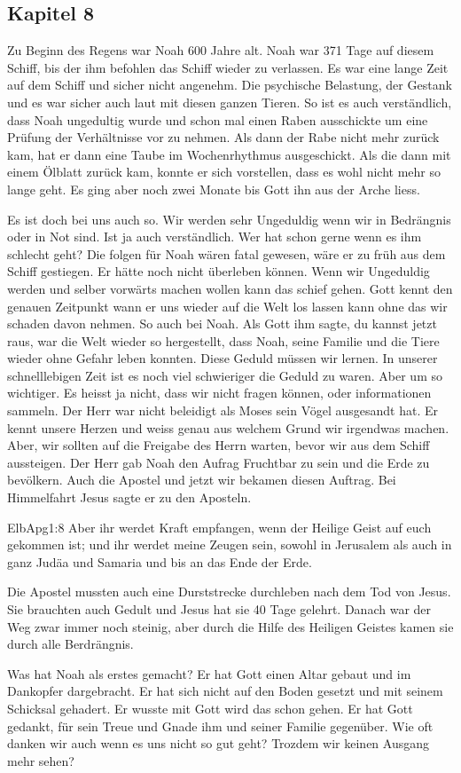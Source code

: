 \subsection{Kapitel 8}
Zu Beginn des Regens war Noah 600 Jahre alt. Noah war 371 Tage auf diesem Schiff, bis der \herr ihm befohlen das Schiff wieder zu verlassen. Es war eine lange Zeit auf dem Schiff und sicher nicht angenehm. Die psychische Belastung, der Gestank und es war sicher auch laut mit diesen ganzen Tieren. So ist es auch verständlich, dass Noah ungedultig wurde und schon mal einen Raben ausschickte um eine Prüfung der Verhältnisse vor zu nehmen. Als dann der Rabe nicht mehr zurück kam, hat er dann eine Taube im Wochenrhythmus ausgeschickt. Als die dann mit einem Ölblatt zurück kam, konnte er sich vorstellen, dass es wohl nicht mehr so lange geht. Es ging aber noch zwei Monate bis Gott ihn aus der Arche liess.

Es ist doch bei uns auch so. Wir werden sehr Ungeduldig wenn wir in Bedrängnis oder in Not sind. Ist ja auch verständlich. Wer hat schon gerne wenn es ihm schlecht geht? Die folgen für Noah wären fatal gewesen, wäre er zu früh aus dem Schiff gestiegen. Er hätte noch nicht überleben können. Wenn wir Ungeduldig werden und selber vorwärts machen wollen kann das schief gehen. Gott kennt den genauen Zeitpunkt wann er uns wieder auf die Welt los lassen kann ohne das wir schaden davon nehmen. So auch bei Noah. Als Gott ihm sagte, du kannst jetzt raus, war die Welt wieder so hergestellt, dass Noah, seine Familie und die Tiere wieder ohne Gefahr leben konnten. Diese Geduld müssen wir lernen. In unserer schnelllebigen Zeit ist es noch viel schwieriger die Geduld zu waren. Aber um so wichtiger. Es heisst ja nicht, dass wir nicht fragen können, oder informationen sammeln. Der Herr war nicht beleidigt als Moses sein Vögel ausgesandt hat. Er kennt unsere Herzen und weiss genau aus welchem Grund wir irgendwas machen. Aber, wir sollten auf die Freigabe des Herrn warten, bevor wir aus dem Schiff aussteigen. Der Herr gab Noah den Aufrag Fruchtbar zu sein und die Erde zu bevölkern. Auch die Apostel und jetzt wir bekamen diesen Auftrag. Bei Himmelfahrt Jesus sagte er zu den Aposteln. 
\begin{bibeltext}{Elb}{Apg}{1:8}
	Aber ihr werdet Kraft empfangen, wenn der Heilige Geist auf euch gekommen ist; und ihr werdet meine Zeugen sein, sowohl in Jerusalem als auch in ganz Judäa und Samaria und bis an das Ende der Erde.
\end{bibeltext} 
Die Apostel mussten auch eine Durststrecke durchleben nach dem Tod von Jesus. Sie brauchten auch Gedult und Jesus hat sie 40 Tage gelehrt. Danach war der Weg zwar immer noch steinig, aber durch die Hilfe des Heiligen Geistes kamen sie durch alle Berdrängnis.

Was hat Noah als erstes gemacht? Er hat Gott einen Altar gebaut und im Dankopfer dargebracht. Er hat sich nicht auf den Boden gesetzt und mit seinem Schicksal gehadert. Er wusste mit Gott wird das schon gehen. Er hat Gott gedankt, für sein Treue und Gnade ihm und seiner Familie gegenüber. Wie oft danken wir auch wenn es uns nicht so gut geht? Trozdem wir keinen Ausgang mehr sehen?